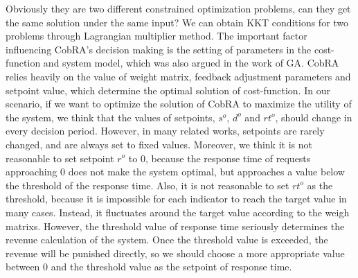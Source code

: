 \documentclass[sigconf]{acmart}
\begin{document}
Obviously they are two different constrained optimization problems, can they get the same solution under the same input?
We can obtain KKT conditions for two problems through Lagrangian multiplier method. The important factor influencing CobRA's decision making is the setting of parameters in the cost-function and system model, which was also argued in the work of GA.
CobRA relies heavily on the value of weight matrix, feedback adjustment parameters and setpoint value, which determine the optimal solution of cost-function.
In our scenario, if we want to optimize the solution of CobRA to maximize the utility of the system, we think that the values of setpoints, $s^o$, $d^o$ and $rt^o$, should change in every decision period. However, in many related works, setpoints are rarely changed, and are always set to fixed values. Moreover, we think it is not reasonable to set setpoint $r^o$ to 0, because the response time of requests approaching 0 does not make the system optimal, but approaches a value below the threshold of the response time.
Also, it is not reasonable to set $rt^o$ as the threshold, because it is impossible for each indicator to reach the target value in many cases. Instead, it fluctuates around the target value according to the weigh matrixs. However, the threshold value of response time seriously determines the revenue calculation of the system. Once the threshold value is exceeded, the revenue will be punished directly, so we should choose a more appropriate value between $0$ and the threshold value as the setpoint of response time.
\end{document}
